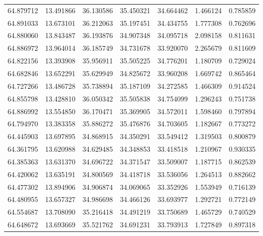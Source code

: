 \begin{tabular}{rrrrrrr}
 64.879712 &  13.491866 &         36.130586 &         35.450321 &         34.664462 &  1.466124 &  0.785859 \\
 64.891033 &  13.673101 &         36.212063 &         35.197451 &         34.434755 &  1.777308 &  0.762696 \\
 64.880060 &  13.843487 &         36.193876 &         34.907348 &         34.095718 &  2.098158 &  0.811631 \\
 64.886972 &  13.964014 &         36.185749 &         34.731678 &         33.920070 &  2.265679 &  0.811609 \\
 64.822156 &  13.393908 &         35.956911 &         35.505225 &         34.776201 &  1.180709 &  0.729024 \\
 64.682846 &  13.652291 &         35.629949 &         34.825672 &         33.960208 &  1.669742 &  0.865464 \\
 64.727266 &  13.486728 &         35.738894 &         35.187109 &         34.272585 &  1.466309 &  0.914524 \\
 64.855798 &  13.428810 &         36.050342 &         35.505838 &         34.754099 &  1.296243 &  0.751738 \\
 64.886992 &  13.554850 &         36.170471 &         35.369905 &         34.572011 &  1.598460 &  0.797894 \\
 64.794970 &  13.383358 &         35.886272 &         35.476876 &         34.703605 &  1.182667 &  0.773272 \\
 64.445903 &  13.697895 &         34.868915 &         34.350291 &         33.549412 &  1.319503 &  0.800879 \\
 64.361795 &  13.620988 &         34.629485 &         34.348853 &         33.418518 &  1.210967 &  0.930335 \\
 64.385363 &  13.631370 &         34.696722 &         34.371547 &         33.509007 &  1.187715 &  0.862539 \\
 64.420062 &  13.635191 &         34.800569 &         34.418718 &         33.536056 &  1.264513 &  0.882662 \\
 64.477302 &  13.894906 &         34.906874 &         34.069065 &         33.352926 &  1.553949 &  0.716139 \\
 64.480955 &  13.657327 &         34.986698 &         34.466126 &         33.693977 &  1.292721 &  0.772149 \\
 64.554687 &  13.708090 &         35.216418 &         34.491219 &         33.750689 &  1.465729 &  0.740529 \\
 64.648672 &  13.693669 &         35.521762 &         34.691231 &         33.793913 &  1.727849 &  0.897318 \\

\end{tabular}
